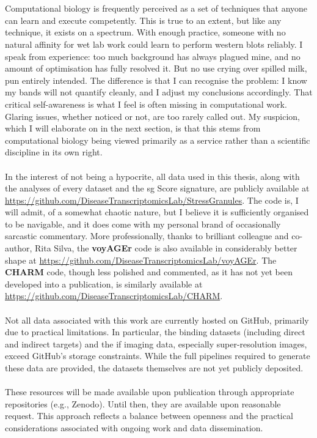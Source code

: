 \\
\\
Computational biology is frequently perceived as a set of techniques that anyone can learn and execute competently. This is true to an extent, but like any technique, it exists on a spectrum. With enough practice, someone with no natural affinity for wet lab work could learn to perform western blots reliably. I speak from experience: too much background has always plagued mine, and no amount of optimisation has fully resolved it. But no use crying over spilled milk, pun entirely intended. The difference is that I can recognise the problem: I know my bands will not quantify cleanly, and I adjust my conclusions accordingly. That critical self-awareness is what I feel is often missing in computational work. Glaring issues, whether noticed or not, are too rarely called out. My suspicion, which I will elaborate on in the next section, is that this stems from computational biology being viewed primarily as a service rather than a scientific discipline in its own right.
\\
\\
In the interest of not being a hypocrite, all data used in this thesis, along with the analyses of every dataset and the \gls{sg} Score signature, are publicly available at \url{https://github.com/DiseaseTranscriptomicsLab/StressGranules}. The code is, I will admit, of a somewhat chaotic nature, but I believe it is sufficiently organised to be navigable, and it does come with my personal brand of occasionally sarcastic commentary. More professionally, thanks to brilliant colleague and co-author, Rita Silva, the \textbf{voyAGEr} code is also available in considerably better shape at \url{https://github.com/DiseaseTranscriptomicsLab/voyAGEr}. The \textbf{CHARM} code, though less polished and commented, as it has not yet been developed into a publication, is similarly available at \url{https://github.com/DiseaseTranscriptomicsLab/CHARM}.
\\
\\
Not all data associated with this work are currently hosted on GitHub, primarily due to practical limitations. In particular, the binding datasets (including direct and indirect targets) and the \gls{if} imaging data, especially super-resolution images, exceed GitHub’s storage constraints. While the full pipelines required to generate these data are provided, the datasets themselves are not yet publicly deposited.
\\
\\
These resources will be made available upon publication through appropriate repositories (e.g., Zenodo). Until then, they are available upon reasonable request. This approach reflects a balance between openness and the practical considerations associated with ongoing work and data dissemination. 
